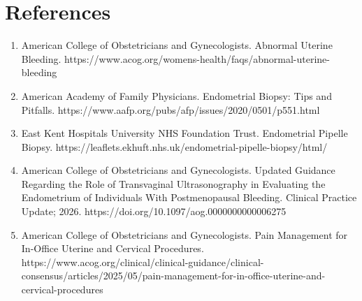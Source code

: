 \section*{References}
\begin{enumerate}
  \item American College of Obstetricians and Gynecologists. Abnormal Uterine Bleeding. https://www.acog.org/womens-health/faqs/abnormal-uterine-bleeding
  \item American Academy of Family Physicians. Endometrial Biopsy: Tips and Pitfalls. https://www.aafp.org/pubs/afp/issues/2020/0501/p551.html
  \item East Kent Hospitals University NHS Foundation Trust. Endometrial Pipelle Biopsy. https://leaflets.ekhuft.nhs.uk/endometrial-pipelle-biopsy/html/
  \item American College of Obstetricians and Gynecologists. Updated Guidance Regarding the Role of Transvaginal Ultrasonography in Evaluating the Endometrium of Individuals With Postmenopausal Bleeding. Clinical Practice Update; 2026. https://doi.org/10.1097/aog.0000000000006275
  \item American College of Obstetricians and Gynecologists. Pain Management for In-Office Uterine and Cervical Procedures. https://www.acog.org/clinical/clinical-guidance/clinical-consensus/articles/2025/05/pain-management-for-in-office-uterine-and-cervical-procedures
\end{enumerate}

\clearpage

